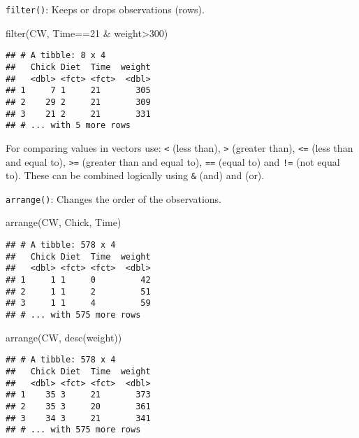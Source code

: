 \documentclass[
]{book}
\newenvironment{Shaded}{\begin{snugshade}}{\end{snugshade}}
\newcommand{\DecValTok}[1]{\textcolor[rgb]{0.00,0.00,0.81}{#1}}
\newcommand{\FunctionTok}[1]{\textcolor[rgb]{0.00,0.00,0.00}{#1}}
\newcommand{\NormalTok}[1]{#1}
\newcommand{\SpecialCharTok}[1]{\textcolor[rgb]{0.00,0.00,0.00}{#1}}
\begin{document}
\texttt{filter()}: Keeps or drops observations (rows).

\begin{Shaded}
\begin{Highlighting}[]
\FunctionTok{filter}\NormalTok{(CW, Time}\SpecialCharTok{==}\DecValTok{21} \SpecialCharTok{\&}\NormalTok{ weight}\SpecialCharTok{\textgreater{}}\DecValTok{300}\NormalTok{)}
\end{Highlighting}
\end{Shaded}

\begin{verbatim}
## # A tibble: 8 x 4
##   Chick Diet  Time  weight
##   <dbl> <fct> <fct>  <dbl>
## 1     7 1     21       305
## 2    29 2     21       309
## 3    21 2     21       331
## # ... with 5 more rows
\end{verbatim}

For comparing values in vectors use: \texttt{\textless{}} (less than), \texttt{\textgreater{}} (greater than), \texttt{\textless{}=}
(less than and equal to), \texttt{\textgreater{}=} (greater than and equal to), \texttt{==} (equal to) and \texttt{!=}
(not equal to). These can be combined logically using \texttt{\&} (and) and \texttt{\textbar{}} (or).

\hfill\break

\texttt{arrange()}: Changes the order of the observations.

\begin{Shaded}
\begin{Highlighting}[]
\FunctionTok{arrange}\NormalTok{(CW, Chick, Time)}
\end{Highlighting}
\end{Shaded}

\begin{verbatim}
## # A tibble: 578 x 4
##   Chick Diet  Time  weight
##   <dbl> <fct> <fct>  <dbl>
## 1     1 1     0         42
## 2     1 1     2         51
## 3     1 1     4         59
## # ... with 575 more rows
\end{verbatim}

\begin{Shaded}
\begin{Highlighting}[]
\FunctionTok{arrange}\NormalTok{(CW, }\FunctionTok{desc}\NormalTok{(weight))}
\end{Highlighting}
\end{Shaded}

\begin{verbatim}
## # A tibble: 578 x 4
##   Chick Diet  Time  weight
##   <dbl> <fct> <fct>  <dbl>
## 1    35 3     21       373
## 2    35 3     20       361
## 3    34 3     21       341
## # ... with 575 more rows
\end{verbatim}
\end{document}
